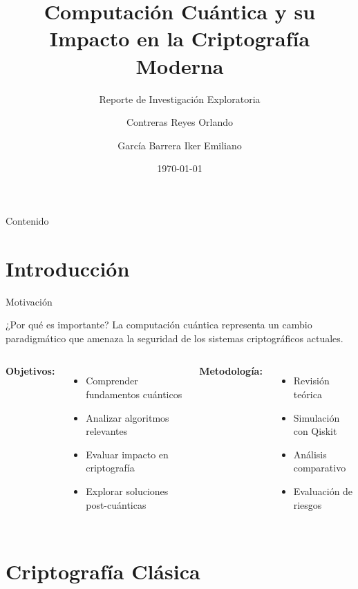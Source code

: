 \documentclass[aspectratio=169]{beamer}
\title{Computación Cuántica y su Impacto en la Criptografía Moderna}
\subtitle{Reporte de Investigación Exploratoria}
\author{Contreras Reyes Orlando \and García Barrera Iker Emiliano}
\institute{Universidad Autónoma de Aguascalientes \\ Ingeniería Electrónica}
\date{\today}
\begin{document}
\begin{frame}
\titlepage
\end{frame}

\begin{frame}{Contenido}
\tableofcontents
\end{frame}

\section{Introducción}

\begin{frame}{Motivación}
\begin{block}{¿Por qué es importante?}
La computación cuántica representa un cambio paradigmático que amenaza la seguridad de los sistemas criptográficos actuales.
\end{block}

\vspace{0.5cm}

\begin{columns}[T]
\textbf{Objetivos:}
\begin{itemize}
\item Comprender fundamentos cuánticos
\item Analizar algoritmos relevantes
\item Evaluar impacto en criptografía
\item Explorar soluciones post-cuánticas
\end{itemize}

\textbf{Metodología:}
\begin{itemize}
\item Revisión teórica
\item Simulación con Qiskit
\item Análisis comparativo
\item Evaluación de riesgos
\end{itemize}
\end{columns}
\end{frame}



\section{Criptografía Clásica}
\end{document}
